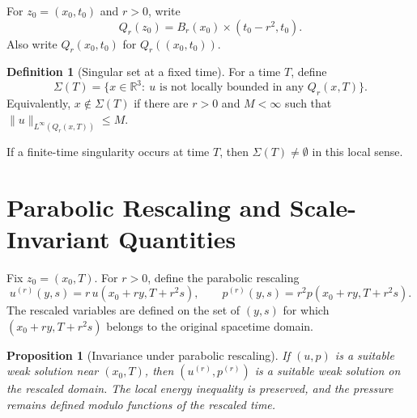\documentclass[11pt]{amsart}
\theoremstyle{plain}
\newtheorem{proposition}[proposition]{Proposition}
\theoremstyle{definition}
\newtheorem{definition}[definition]{Definition}
\theoremstyle{remark}
\numberwithin{equation}{section}
\begin{document}
For \(z_0=(x_0,t_0)\) and \(r>0\), write
\[
  Q_r(z_0)=B_r(x_0)\times(t_0-r^2,t_0).
\]
Also write \(Q_r(x_0,t_0)\) for \(Q_r((x_0,t_0))\).

\begin{definition}[Singular set at a fixed time]
For a time \(T\), define
\[
  \Sigma(T)=
  \{x\in\mathbb R^3:\ u\text{ is not locally bounded in any }
  Q_r(x,T)\}.
\]
Equivalently, \(x\notin\Sigma(T)\) if there are \(r>0\) and \(M<\infty\) such
that \(\|u\|_{L^\infty(Q_r(x,T))}\le M\).
\end{definition}

If a finite-time singularity occurs at time \(T\), then
\(\Sigma(T)\ne\emptyset\) in this local sense.

\section{Parabolic Rescaling and Scale-Invariant Quantities}

Fix \(z_0=(x_0,T)\).  For \(r>0\), define the parabolic rescaling
\[
  u^{(r)}(y,s)=r\,u(x_0+ry,T+r^2s),
  \qquad
  p^{(r)}(y,s)=r^2p(x_0+ry,T+r^2s).
\]
The rescaled variables are defined on the set of \((y,s)\) for which
\((x_0+ry,T+r^2s)\) belongs to the original spacetime domain.

\begin{proposition}[Invariance under parabolic rescaling]
If \((u,p)\) is a suitable weak solution near \((x_0,T)\), then
\((u^{(r)},p^{(r)})\) is a suitable weak solution on the rescaled domain.  The
local energy inequality is preserved, and the pressure remains defined modulo
functions of the rescaled time.
\end{proposition}
\end{document}
